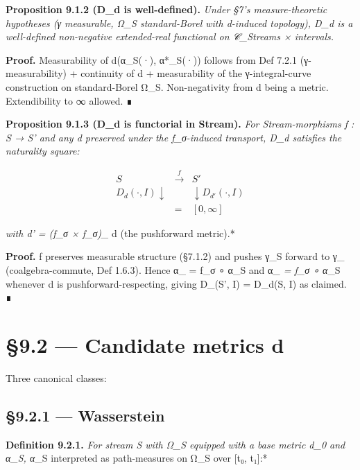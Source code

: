 \documentclass[11pt, openany]{book}
\newcommand{\sectionbreak}{\clearpage}
\begin{document}
\textbf{Proposition 9.1.2 (D\_\allowbreak{}d is well-defined).} \textit{Under §7's measure-theoretic hypotheses (γ measurable, Ω\_\allowbreak{}S standard-Borel with d-induced topology), D\_\allowbreak{}d is a well-defined non-negative extended-real functional on 𝒞\_\allowbreak{}Streams × {intervals}.}

\textbf{Proof.} Measurability of d(α\_\allowbreak{}S(·), α*\_\allowbreak{}S(·)) follows from Def 7.2.1 (γ-measurability) + continuity of d + measurability of the γ-integral-curve construction on standard-Borel Ω\_\allowbreak{}S. Non-negativity from d being a metric. Extendibility to ∞ allowed. ∎

\textbf{Proposition 9.1.3 (D\_\allowbreak{}d is functorial in Stream).} \textit{For Stream-morphisms f : S → S' and any d preserved under the f\_\allowbreak{}σ-induced transport, D\_\allowbreak{}d satisfies the naturality square:}

\[
\begin{array}{ccc}
S & \xrightarrow{f} & S' \\
{\scriptstyle D_d(\cdot, I)} \downarrow & & \downarrow {\scriptstyle D_{d'}(\cdot, I)} \\
[0, \infty] & = & [0, \infty]
\end{array}
\]

\textit{with d' = (f\_\allowbreak{}σ × f\_\allowbreak{}σ)\_\allowbreak{}} d (the pushforward metric).*

\textbf{Proof.} f preserves measurable structure (§7.1.2) and pushes γ\_\allowbreak{}S forward to γ\_ (coalgebra-commute, Def 1.6.3). Hence α\_ = f\_\allowbreak{}σ ∘ α\_\allowbreak{}S and α\textit{\_ = f\_\allowbreak{}σ ∘ α}\_\allowbreak{}S whenever d is pushforward-respecting, giving D\_(S', I) = D\_\allowbreak{}d(S, I) as claimed. ∎

\sectionbreak

\section{§9.2 --- Candidate metrics d}

Three canonical classes:

\subsection{§9.2.1 --- Wasserstein}

\textbf{Definition 9.2.1.} \textit{For stream S with Ω\_\allowbreak{}S equipped with a base metric d\_\allowbreak{}0 and α\_\allowbreak{}S, α}\_\allowbreak{}S interpreted as path-measures on Ω\_\allowbreak{}S over [t₀, t₁]:*
\end{document}
